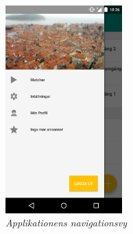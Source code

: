 \documentclass[a4paper, 11pt]{article}
\begin{document}
\begin{enumerate}
\begin{figure}[H]
	\begin{center}
	\includegraphics[width=0.4\textwidth]{app_drawer} 
	\end{center}
	\caption{\textit{Applikationens navigationsvy}}
\end{figure}



\end{enumerate}
\end{document}
